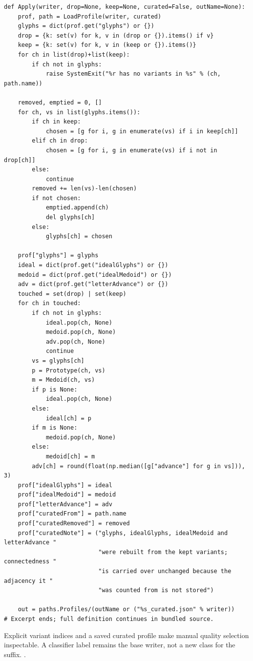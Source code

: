\begin{lstlisting}[style=plain]
def Apply(writer, drop=None, keep=None, curated=False, outName=None):
    prof, path = LoadProfile(writer, curated)
    glyphs = dict(prof.get("glyphs") or {})
    drop = {k: set(v) for k, v in (drop or {}).items() if v}
    keep = {k: set(v) for k, v in (keep or {}).items()}
    for ch in list(drop)+list(keep):
        if ch not in glyphs:
            raise SystemExit("%r has no variants in %s" % (ch, path.name))

    removed, emptied = 0, []
    for ch, vs in list(glyphs.items()):
        if ch in keep:
            chosen = [g for i, g in enumerate(vs) if i in keep[ch]]
        elif ch in drop:
            chosen = [g for i, g in enumerate(vs) if i not in drop[ch]]
        else:
            continue
        removed += len(vs)-len(chosen)
        if not chosen:
            emptied.append(ch)
            del glyphs[ch]
        else:
            glyphs[ch] = chosen

    prof["glyphs"] = glyphs
    ideal = dict(prof.get("idealGlyphs") or {})
    medoid = dict(prof.get("idealMedoid") or {})
    adv = dict(prof.get("letterAdvance") or {})
    touched = set(drop) | set(keep)
    for ch in touched:
        if ch not in glyphs:
            ideal.pop(ch, None)
            medoid.pop(ch, None)
            adv.pop(ch, None)
            continue
        vs = glyphs[ch]
        p = Prototype(ch, vs)
        m = Medoid(ch, vs)
        if p is None:
            ideal.pop(ch, None)
        else:
            ideal[ch] = p
        if m is None:
            medoid.pop(ch, None)
        else:
            medoid[ch] = m
        adv[ch] = round(float(np.median([g["advance"] for g in vs])), 3)
    prof["idealGlyphs"] = ideal
    prof["idealMedoid"] = medoid
    prof["letterAdvance"] = adv
    prof["curatedFrom"] = path.name
    prof["curatedRemoved"] = removed
    prof["curatedNote"] = ("glyphs, idealGlyphs, idealMedoid and letterAdvance "
                           "were rebuilt from the kept variants; connectedness "
                           "is carried over unchanged because the adjacency it "
                           "was counted from is not stored")

    out = paths.Profiles/(outName or ("%s_curated.json" % writer))
# Excerpt ends; full definition continues in bundled source.
\end{lstlisting}
Explicit variant indices and a saved curated profile make manual quality selection inspectable. A classifier label remains the base writer, not a new class for the suffix. \cite{code2026,haines2016,pillowdraw}.



